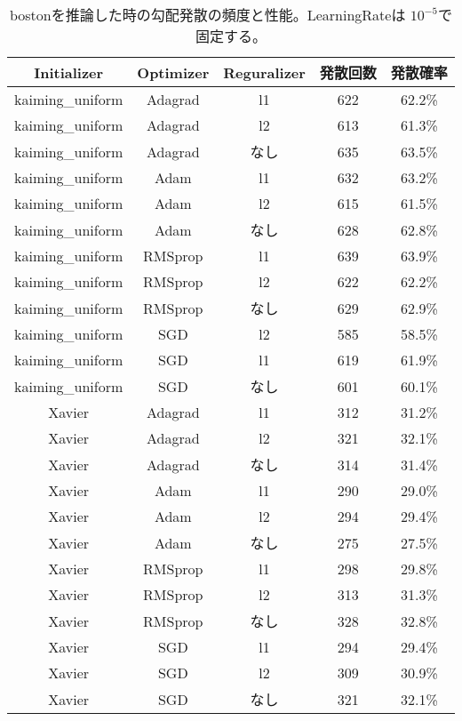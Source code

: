 \begin{table}[htbp]
    \begin{center}
        \caption{bostonを推論した時の勾配発散の頻度と性能。LearningRateは $ 10^{-5} $で固定する。 }
        \label{appendix:errorcount_table}
        \vspace{2mm} 
        \begin{tabular}{ |c|c|c|c|c| }
        \hline
        Initializer & Optimizer &  Reguralizer & 発散回数 & 発散確率 \\
        \hline
        kaiming\_uniform & Adagrad & l1 & 622 & 62.2\% \\
        \hline
        kaiming\_uniform & Adagrad & l2 & 613 & 61.3\% \\
        \hline
        kaiming\_uniform & Adagrad & なし & 635 & 63.5\% \\
        \hline
        kaiming\_uniform & Adam & l1 & 632 & 63.2\% \\
        \hline
        kaiming\_uniform & Adam & l2 & 615 & 61.5\% \\
        \hline
        kaiming\_uniform & Adam & なし & 628 & 62.8\% \\
        \hline
        kaiming\_uniform & RMSprop & l1 & 639 & 63.9\% \\
        \hline
        kaiming\_uniform & RMSprop & l2 & 622 & 62.2\% \\
        \hline
        kaiming\_uniform & RMSprop & なし & 629 & 62.9\% \\
        \hline
        kaiming\_uniform & SGD & l2 & 585 & 58.5\% \\
        \hline
        kaiming\_uniform & SGD & l1 & 619 & 61.9\% \\
        \hline
        kaiming\_uniform & SGD & なし & 601 & 60.1\% \\
        \hline
        Xavier & Adagrad & l1 & 312 & 31.2\% \\
        \hline
        Xavier & Adagrad & l2 & 321 & 32.1\% \\
        \hline
        Xavier & Adagrad & なし & 314 & 31.4\% \\
        \hline
        Xavier & Adam & l1 & 290 & 29.0\% \\
        \hline
        Xavier & Adam & l2 & 294 & 29.4\% \\
        \hline
        Xavier & Adam & なし & 275 & 27.5\% \\
        \hline
        Xavier & RMSprop & l1 & 298 & 29.8\% \\
        \hline
        Xavier & RMSprop & l2 & 313 & 31.3\% \\
        \hline
        Xavier & RMSprop & なし & 328 & 32.8\% \\
        \hline
        Xavier & SGD & l1 & 294 & 29.4\% \\
        \hline
        Xavier & SGD & l2 & 309 & 30.9\% \\
        \hline
        Xavier & SGD & なし & 321 & 32.1\% \\
        \hline
        \end{tabular}
    \end{center}
\end{table}
